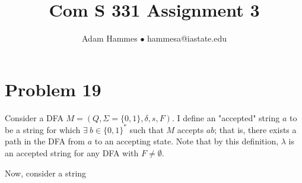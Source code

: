 \documentclass[11pt]{article}
\begin{document}
\title{Com S 331 Assignment 3}
\author{Adam Hammes $\bullet$ hammesa@iastate.edu }
\maketitle

\section*{Problem 19}
Consider a DFA $M = (Q, \Sigma = \{0,1\}, \delta, s, F)$. I define an "accepted" string $a$ to be a string for which $ \exists\ b \in \{0,1\}^*$ such that $M$ accepts $ab$; that is, there exists a path in the DFA from $a$ to an accepting state. Note that by this definition, $\lambda$ is an accepted string for any DFA with $F \neq \emptyset$.

Now, consider a string 
\end{document}
